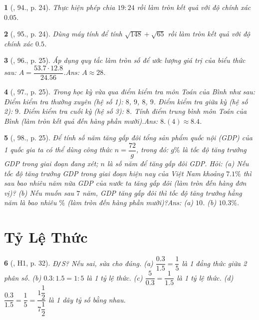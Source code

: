 \documentclass{article}
\newtheorem{baitoan}{}
\begin{document}
\begin{baitoan}[\cite{Tuyen_Toan_7}, 94., p. 24]
	Thực hiện phép chia $19:24$ rồi làm tròn kết quả với độ chính xác $0.05$.
\end{baitoan}

\begin{baitoan}[\cite{Tuyen_Toan_7}, 95., p. 24]
	Dùng máy  tính để tính $\sqrt{148} + \sqrt{65}$ rồi làm tròn kết quả với độ chính xác $0.5$.
\end{baitoan}

\begin{baitoan}[\cite{Tuyen_Toan_7}, 96., p. 25]
	Áp dụng quy tắc làm tròn số để ước lượng giá trị của biểu thức sau: $A = \dfrac{53.7\cdot 12.8}{24.56}$.\hfill{\sf Ans:} $A\approx 28$.
\end{baitoan}

\begin{baitoan}[\cite{Tuyen_Toan_7}, 97., p. 25]
	Trong học kỳ vừa qua điểm kiểm tra môn Toán của Bình như sau: Điểm kiểm tra thường xuyên (hệ số 1): $8$, $9$, $8$, $9$. Điểm kiểm tra giữa kỳ (hệ số 2): $9$. Điểm kiểm tra cuối kỳ (hệ số 3): $8$. Tính điểm trung bình môn Toán của Bình (làm tròn kết quả đến hàng phần mười).\hfill{\sf Ans:} $8.(4)\approx8.4$.
\end{baitoan}

\begin{baitoan}[\cite{Tuyen_Toan_7}, 98., p. 25]
	Để tính số năm tăng gấp đôi tổng sản phẩm quốc nội (GDP) của 1 quốc gia ta có thể dùng công thức $n = \dfrac{72}{g}$, trong đó: $g\%$ là {\rm tốc độ tăng trưởng GDP} trong giai đoạn đang xét; $n$ là số năm để tăng gấp đôi GDP. Hỏi: (a) Nếu tốc độ tăng trưởng GDP trong giai đoạn hiện nay của Việt Nam khoảng $7.1\%$ thì sau bao nhiêu năm nữa GDP của nước ta tăng gấp đôi (làm tròn đến hàng đơn vị)? (b) Nếu muốn sau $7$ năm, GDP tăng gấp đôi thì tốc độ tăng trưởng hằng năm là bao nhiêu $\%$ (làm tròn đến hàng phần mười)?\hfill{\sf Ans:} (a) $10$. (b) $10.3\%$.
\end{baitoan}


\section{Tỷ Lệ Thức}

\begin{baitoan}[\cite{Binh_boi_duong_Toan_7_tap_1}, H1, p. 32]
	{\rm Đ{\tt/}S?} Nếu sai, sửa cho đúng. (a) $\dfrac{0.3}{1.5} = \dfrac{1}{5}$ là 1 đẳng thức giữa 2 phân số. (b) $0.3:1.5 = 1:5$ là 1 tỷ lệ thức. (c) $\dfrac{5}{0.3} = \dfrac{1}{1.5}$ là 1 tỷ lệ thức. (d) $\dfrac{0.3}{1.5} = \dfrac{1}{5} = \dfrac{1\dfrac{1}{2}}{7\dfrac{1}{2}}$ là 1 dãy tỷ số bằng nhau.
\end{baitoan}
\end{document}
